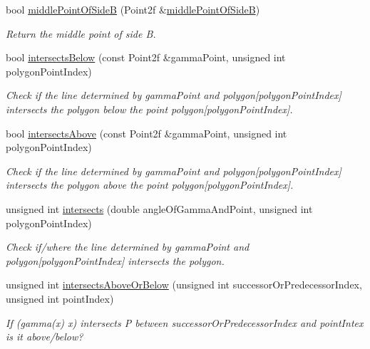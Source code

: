 \begin{DoxyCompactItemize}
bool \hyperlink{classmultiscale_1_1MinEnclosingTriangleFinder_a664bee3e51e007b97fa21a92830f9066}{middle\-Point\-Of\-Side\-B} (\-Point2f \&\hyperlink{classmultiscale_1_1MinEnclosingTriangleFinder_a664bee3e51e007b97fa21a92830f9066}{middle\-Point\-Of\-Side\-B})
\begin{DoxyCompactList}\small\item\em \-Return the middle point of side \-B. \end{DoxyCompactList}\item 
bool \hyperlink{classmultiscale_1_1MinEnclosingTriangleFinder_a0abe1c7d5ef5a43f8ea1b404db0066e0}{intersects\-Below} (const \-Point2f \&gamma\-Point, unsigned int polygon\-Point\-Index)
\begin{DoxyCompactList}\small\item\em \-Check if the line determined by gamma\-Point and polygon\mbox{[}polygon\-Point\-Index\mbox{]} intersects the polygon below the point polygon\mbox{[}polygon\-Point\-Index\mbox{]}. \end{DoxyCompactList}\item 
bool \hyperlink{classmultiscale_1_1MinEnclosingTriangleFinder_aba0848fcc9021b379fd5f02a6708912d}{intersects\-Above} (const \-Point2f \&gamma\-Point, unsigned int polygon\-Point\-Index)
\begin{DoxyCompactList}\small\item\em \-Check if the line determined by gamma\-Point and polygon\mbox{[}polygon\-Point\-Index\mbox{]} intersects the polygon above the point polygon\mbox{[}polygon\-Point\-Index\mbox{]}. \end{DoxyCompactList}\item 
unsigned int \hyperlink{classmultiscale_1_1MinEnclosingTriangleFinder_a586e3fde222d1464eb57a3e20ceb136c}{intersects} (double angle\-Of\-Gamma\-And\-Point, unsigned int polygon\-Point\-Index)
\begin{DoxyCompactList}\small\item\em \-Check if/where the line determined by gamma\-Point and polygon\mbox{[}polygon\-Point\-Index\mbox{]} intersects the polygon. \end{DoxyCompactList}\item 
unsigned int \hyperlink{classmultiscale_1_1MinEnclosingTriangleFinder_a622303a315704ffb0e262ec66f2a07fb}{intersects\-Above\-Or\-Below} (unsigned int successor\-Or\-Predecessor\-Index, unsigned int point\-Index)
\begin{DoxyCompactList}\small\item\em \-If (gamma(x) x) intersects \-P between successor\-Or\-Predecessor\-Index and point\-Intex is it above/below? \end{DoxyCompactList}\item 

\end{DoxyCompactItemize}

